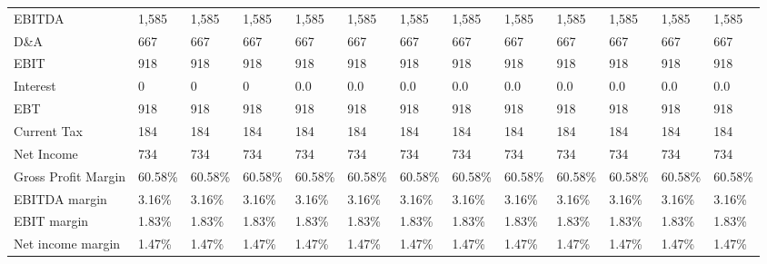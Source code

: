 \begin{tabular}{lllllllllllll}
 EBITDA                   & 1,585  & 1,585  & 1,585  & 1,585  & 1,585  & 1,585  & 1,585  & 1,585  & 1,585  & 1,585  & 1,585  & 1,585  \\
 D\&A                      & 667    & 667    & 667    & 667    & 667    & 667    & 667    & 667    & 667    & 667    & 667    & 667    \\
 EBIT                     & 918    & 918    & 918    & 918    & 918    & 918    & 918    & 918    & 918    & 918    & 918    & 918    \\
 Interest                 & 0      & 0      & 0      & 0.0    & 0.0    & 0.0    & 0.0    & 0.0    & 0.0    & 0.0    & 0.0    & 0.0    \\
 EBT                      & 918    & 918    & 918    & 918    & 918    & 918    & 918    & 918    & 918    & 918    & 918    & 918    \\
 Current Tax              & 184    & 184    & 184    & 184    & 184    & 184    & 184    & 184    & 184    & 184    & 184    & 184    \\
 Net Income               & 734    & 734    & 734    & 734    & 734    & 734    & 734    & 734    & 734    & 734    & 734    & 734    \\
 Gross Profit Margin      & 60.58\% & 60.58\% & 60.58\% & 60.58\% & 60.58\% & 60.58\% & 60.58\% & 60.58\% & 60.58\% & 60.58\% & 60.58\% & 60.58\% \\
 EBITDA margin            & 3.16\%  & 3.16\%  & 3.16\%  & 3.16\%  & 3.16\%  & 3.16\%  & 3.16\%  & 3.16\%  & 3.16\%  & 3.16\%  & 3.16\%  & 3.16\%  \\
 EBIT margin              & 1.83\%  & 1.83\%  & 1.83\%  & 1.83\%  & 1.83\%  & 1.83\%  & 1.83\%  & 1.83\%  & 1.83\%  & 1.83\%  & 1.83\%  & 1.83\%  \\
 Net income margin        & 1.47\%  & 1.47\%  & 1.47\%  & 1.47\%  & 1.47\%  & 1.47\%  & 1.47\%  & 1.47\%  & 1.47\%  & 1.47\%  & 1.47\%  & 1.47\%  \\
\hline
\end{tabular}